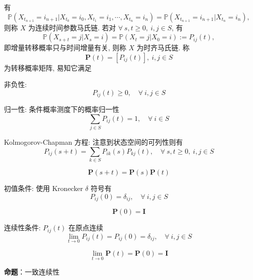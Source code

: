 \documentclass[openany]{ctexbook}
\theoremstyle{kaiti}
\theoremstyle{normal}
\begin{document}
有
\begin{equation}
  \mathbb{P}(X_{t_{n+1}}=i_{n+1}|X_{t_0}=i_0,X_{t_1}=i_1,\cdots,X_{t_n}=i_n)=\mathbb{P}(X_{t_{n+1}}=i_{n+1}|X_{t_n}=i_n),
\end{equation}
则称 $X$ 为连续时间参数马氏链. 若对 $\forall~s,t\geqslant0,~i,j\in S$, 有
\begin{equation}
  \mathbb{P}(X_{s+t}=j|X_s=i)=\mathbb{P}(X_t=j|X_0=i):= P_{ij}(t),
\end{equation}
即增量转移概率只与时间增量有关, 则称 $X$ 为时齐马氏链. 称
\begin{equation}
  \bm{P}(t)=[P_{ij}(t)],~i,j\in S
\end{equation}
为转移概率矩阵, 易知它满足

非负性: 
\begin{equation}
  P_{ij}(t)\geqslant0,\quad\forall~i,j\in S
\end{equation}

归一性: 条件概率测度下的概率归一性
\begin{equation}
  \sum_{j\in S}P_{ij}(t)=1,\quad \forall~i\in S
\end{equation}

Kolmogorov-Chapman 方程: 注意到状态空间的可列性则有
\begin{equation}
  P_{ij}(s+t)=\sum_{k\in S}P_{ik}(s)P_{kj}(t),\quad\forall~s,t\geqslant0,~i,j\in S
\end{equation}

\begin{equation}
  \bm{P}(s+t)=\bm{P}(s)\bm{P}(t)
\end{equation}

初值条件: 使用 Kronecker $\delta$ 符号有
\begin{equation}
  P_{ij}(0)=\delta_{ij},\quad\forall~i,j\in S
\end{equation}

\begin{equation}
  \bm{P}(0)=\bm{I}
\end{equation}

连续性条件: $P_{ij}(t)$ 在原点连续
\begin{equation}
  \lim_{t\to0}P_{ij}(t)=P_{ij}(0)=\delta_{ij},\quad\forall~i,j\in S
\end{equation}

\begin{equation}
  \lim_{t\to0}\bm{P}(t)=\bm{P}(0)=\bm{I}
\end{equation}

\textbf{命题}：一致连续性
\end{document}
